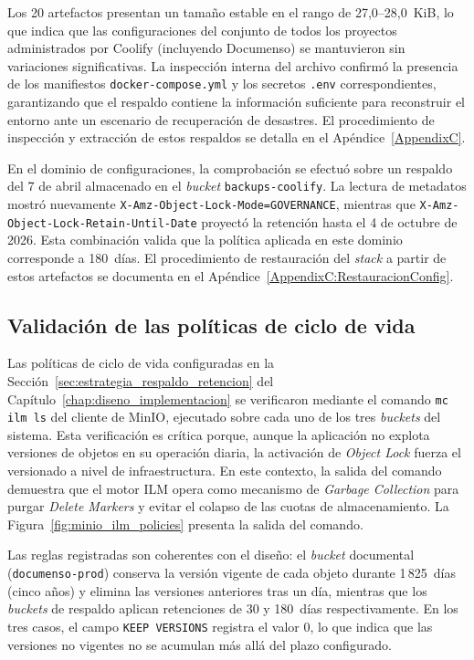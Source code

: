 \FloatBarrier

Los 20 artefactos presentan un tamaño estable en el rango de 27,0--28,0~KiB, lo que indica que las configuraciones del conjunto de todos los proyectos administrados por Coolify (incluyendo Documenso) se mantuvieron sin variaciones significativas. La inspección interna del archivo confirmó la presencia de los manifiestos \texttt{docker-compose.yml} y los secretos \texttt{.env} correspondientes, garantizando que el respaldo contiene la información suficiente para reconstruir el entorno ante un escenario de recuperación de desastres. El procedimiento de inspección y extracción de estos respaldos se detalla en el Apéndice~\ref{AppendixC}.

En el dominio de configuraciones, la comprobación se efectuó sobre un respaldo del 7 de abril almacenado en el \textit{bucket} \texttt{backups-coolify}. La lectura de metadatos mostró nuevamente \texttt{X-\allowbreak Amz-\allowbreak Object-\allowbreak Lock-\allowbreak Mode=\allowbreak GOVERNANCE}, mientras que \texttt{X-\allowbreak Amz-\allowbreak Object-\allowbreak Lock-\allowbreak Retain-\allowbreak Until-\allowbreak Date} proyectó la retención hasta el 4 de octubre de 2026. Esta combinación valida que la política aplicada en este dominio corresponde a 180~días. El procedimiento de restauración del \textit{stack} a partir de estos artefactos se documenta en el Apéndice~\ref{AppendixC:RestauracionConfig}.

\subsection{Validación de las políticas de ciclo de vida}
\label{subsec:validacion_ilm}

Las políticas de ciclo de vida configuradas en la Sección~\ref{sec:estrategia_respaldo_retencion} del Capítulo~\ref{chap:diseno_implementacion} se verificaron mediante el comando \texttt{mc ilm ls} del cliente de MinIO, ejecutado sobre cada uno de los tres \textit{buckets} del sistema. Esta verificación es crítica porque, aunque la aplicación no explota versiones de objetos en su operación diaria, la activación de \textit{Object Lock} fuerza el versionado a nivel de infraestructura. En este contexto, la salida del comando demuestra que el motor ILM opera como mecanismo de \textit{Garbage Collection} para purgar \textit{Delete Markers} y evitar el colapso de las cuotas de almacenamiento. La Figura~\ref{fig:minio_ilm_policies} presenta la salida del comando.

Las reglas registradas son coherentes con el diseño: el \textit{bucket} documental (\texttt{documenso-prod}) conserva la versión vigente de cada objeto durante 1\,825~días (cinco años) y elimina las versiones anteriores tras un día, mientras que los \textit{buckets} de respaldo aplican retenciones de 30 y 180~días respectivamente. En los tres casos, el campo \texttt{KEEP VERSIONS} registra el valor 0, lo que indica que las versiones no vigentes no se acumulan más allá del plazo configurado.

